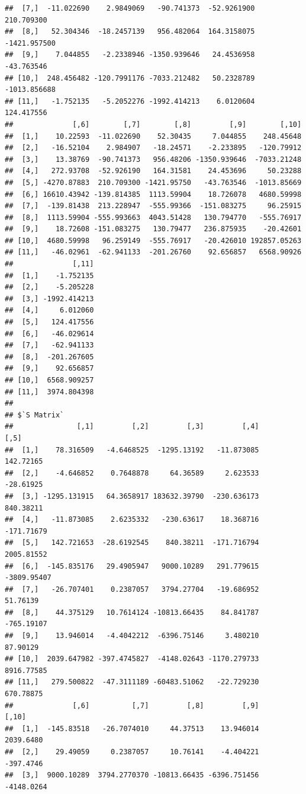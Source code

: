 \documentclass[
  10pt,
]{krantz}
\begin{document}
\begin{verbatim}
##  [7,]  -11.022690    2.9849069   -90.741373  -52.9261900   210.709300
##  [8,]   52.304346  -18.2457139   956.482064  164.3158075 -1421.957500
##  [9,]    7.044855   -2.2338946 -1350.939646   24.4536958   -43.763546
## [10,]  248.456482 -120.7991176 -7033.212482   50.2328789 -1013.856688
## [11,]   -1.752135   -5.2052276 -1992.414213    6.0120604   124.417556
##              [,6]        [,7]        [,8]         [,9]        [,10]
##  [1,]    10.22593  -11.022690    52.30435     7.044855    248.45648
##  [2,]   -16.52104    2.984907   -18.24571    -2.233895   -120.79912
##  [3,]    13.38769  -90.741373   956.48206 -1350.939646  -7033.21248
##  [4,]   272.93708  -52.926190   164.31581    24.453696     50.23288
##  [5,] -4270.87883  210.709300 -1421.95750   -43.763546  -1013.85669
##  [6,] 16610.43942 -139.814385  1113.59904    18.726078   4680.59998
##  [7,]  -139.81438  213.228947  -555.99366  -151.083275     96.25915
##  [8,]  1113.59904 -555.993663  4043.51428   130.794770   -555.76917
##  [9,]    18.72608 -151.083275   130.79477   236.875935    -20.42601
## [10,]  4680.59998   96.259149  -555.76917   -20.426010 192857.05263
## [11,]   -46.02961  -62.941133  -201.26760    92.656857   6568.90926
##              [,11]
##  [1,]    -1.752135
##  [2,]    -5.205228
##  [3,] -1992.414213
##  [4,]     6.012060
##  [5,]   124.417556
##  [6,]   -46.029614
##  [7,]   -62.941133
##  [8,]  -201.267605
##  [9,]    92.656857
## [10,]  6568.909257
## [11,]  3974.804398
## 
## $`S Matrix`
##               [,1]         [,2]         [,3]         [,4]        [,5]
##  [1,]    78.316509   -4.6468525  -1295.13192   -11.873085   142.72165
##  [2,]    -4.646852    0.7648878     64.36589     2.623533   -28.61925
##  [3,] -1295.131915   64.3658917 183632.39790  -230.636173   840.38211
##  [4,]   -11.873085    2.6235332   -230.63617    18.368716  -171.71679
##  [5,]   142.721653  -28.6192545    840.38211  -171.716794  2005.81552
##  [6,]  -145.835176   29.4905947   9000.10289   291.779615 -3809.95407
##  [7,]   -26.707401    0.2387057   3794.27704   -19.686952    51.76139
##  [8,]    44.375129   10.7614124 -10813.66435    84.841787  -765.19107
##  [9,]    13.946014   -4.4042212  -6396.75146     3.480210    87.90129
## [10,]  2039.647982 -397.4745827  -4148.02643 -1170.279733  8916.77585
## [11,]   279.500822  -47.3111189 -60483.51062   -22.729230   670.78875
##              [,6]          [,7]         [,8]         [,9]       [,10]
##  [1,]  -145.83518   -26.7074010     44.37513    13.946014   2039.6480
##  [2,]    29.49059     0.2387057     10.76141    -4.404221   -397.4746
##  [3,]  9000.10289  3794.2770370 -10813.66435 -6396.751456  -4148.0264

\end{verbatim}
\end{document}
